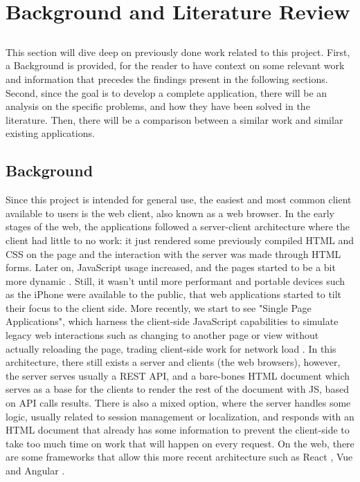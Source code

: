 \chapter{Background and Literature Review} \label{chap:sota}

\section*{}

This section will dive deep on previously done work related to this project. First, a Background is provided, for the reader to have context on some relevant work and information that precedes the findings present in the following sections. Second, since the goal is to develop a complete application, there will be an analysis on the specific problems, and how they have been solved in the literature. Then, there will be a comparison between a similar work and similar existing applications.

\section*{Background}

Since this project is intended for general use, the easiest and most common client available to users is the web client, also known as a web browser. In the early stages of the web, the applications followed a server-client architecture where the client had little to no work: it just rendered some previously compiled HTML and CSS on the page and the interaction with the server was made through HTML forms. Later on, JavaScript usage increased, and the pages started to be a bit more dynamic \cite{ShklarRosen09}. Still, it wasn't until more performant and portable devices such as the iPhone were available to the public, that web applications started to tilt their focus to the client side. More recently, we start to see "Single Page Applications", which harness the client-side JavaScript capabilities to simulate legacy web interactions such as changing to another page or view without actually reloading the page, trading client-side work for network load \cite{Lugo-Cordero2015} \cite{Derezinska2020} \cite{Mesbah2007} \cite{Mesbah2007a}. In this architecture, there still exists a server and clients (the web browsers), however, the server serves usually a REST API, and a bare-bones HTML document which serves as a base for the clients to render the rest of the document with JS, based on API calls results. There is also a mixed option, where the server handles some logic, usually related to session management or localization, and responds with an HTML document that already has some information to prevent the client-side to take too much time on work that will happen on every request. On the web, there are some frameworks that allow this more recent architecture such as React \cite{React}, Vue \cite{Vue} and Angular \cite{Angular}.

